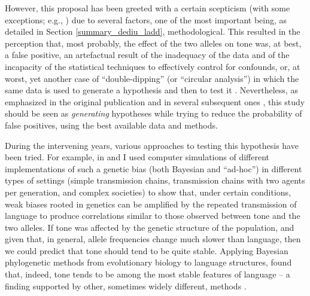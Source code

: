 \documentclass[twoside,onecolumn]{article}
\begin{document}
However, this proposal has been greeted with a certain scepticism  (with some exceptions; e.g., \citealp{roberts_traffic_2013}) due to several factors, one of the most important being, as detailed in Section \ref{summary_dediu_ladd}, methodological.
This resulted in the perception that, most probably, the effect of the two alleles on tone was, at best, a false positive, an artefactual result of the inadequacy of the data and of the incapacity of the statistical techniques to effectively control for confounds, or, at worst, yet another case of ``double-dipping'' (or ``circular analysis'') in which the same data is used to generate a hypothesis and then to test it \citep{kriegeskorte_circular_2009}.
Nevertheless, as emphasized in the original publication and in several subsequent ones \citep{dediu_ladd_2007,ladd_bioling_2008,dediu_humbiol_2011}, this study should be seen as \emph{generating} hypotheses while trying to reduce the probability of false positives, using the best available data and methods.

During the intervening years, various approaches to testing this hypothesis have been tried.
For example, in \citet{dediu_jtb_2008} and \citet{dediu_jtb_2009} I used computer simulations of different implementations of such a genetic bias (both Bayesian and ``ad-hoc'') in different types of settings (simple transmission chains, transmission chains with two agents per generation, and complex societies) to show that, under certain conditions, weak biases rooted in genetics can be amplified by the repeated transmission of language to produce correlations similar to those observed between tone and the two alleles.
If tone was affected by the genetic structure of the population, and given that, in general, allele frequencies change much slower than language, then we could predict that tone should tend to be quite stable.
Applying Bayesian phylogenetic methods from evolutionary biology to language structures, \citet{dediu_procb_2011} found that, indeed, tone tends to be among the most stable features of language -- a finding supported by other, sometimes widely different, methods \citep{dediu_cysouw_2013,kauhanen_geospatial_2018}.
\end{document}
